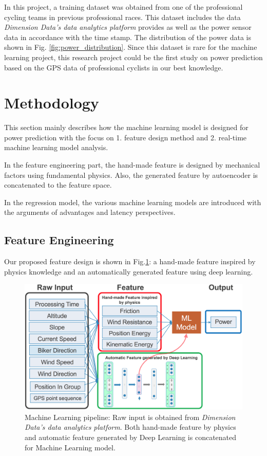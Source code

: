 \documentclass[runningheads]{llncs}
\begin{document}
In this project, a training dataset was obtained from one of the professional cycling teams in previous professional races. This dataset includes the data {\it{Dimension Data's data analytics platform}} provides as well as the power sensor data in accordance with the time stamp. The distribution of the power data is shown in Fig. \ref{fig:power_distribution}. Since this dataset is rare for the machine learning project, this research project could be the first study on power prediction based on the GPS data of professional cyclists in our best knowledge.

\section{Methodology}
This section mainly describes how the machine learning model is designed for power prediction with the focus on 1. feature design method and 2. real-time machine learning model analysis. 

In the feature engineering part, the hand-made feature is designed by mechanical factors using fundamental physics. Also, the generated feature by autoencoder is concatenated to the feature space.

In the regression model, the various machine learning models are introduced with the arguments of advantages and latency perspectives.

\subsection{Feature Engineering}
Our proposed feature design is shown in
Fig.\ref{fig:machine_learning_pipeline}: a hand-made feature inspired by
physics knowledge and an automatically generated feature using deep
learning.

\begin{figure}[t]
 \includegraphics[width=\textwidth]{fig/machineLearningModel.eps}
 \caption{Machine Learning pipeline: Raw input is obtained from
 {\it{Dimension Data's data analytics platform}}. Both hand-made feature
 by physics and automatic feature generated by Deep Learning is
 concatenated for Machine Learning model.}
 \label{fig:machine_learning_pipeline}
\end{figure}
\end{document}
